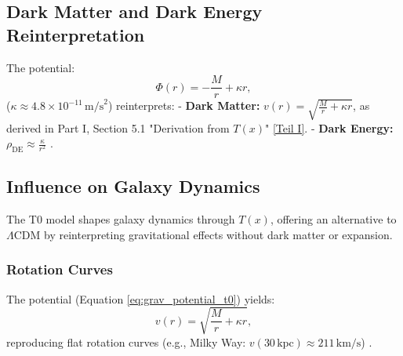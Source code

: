 \documentclass[twocolumn,aps,prl]{revtex4-2}
\newcommand{\Tfield}{T(x)}
\newcommand{\LCDM}{\Lambda\text{CDM}}
\begin{document}
	\subsection{Dark Matter and Dark Energy Reinterpretation}
	\label{subsec:dark_reinterpretation}
	
	The potential:
	\begin{equation}
		\Phi(r) = -\frac{M}{r} + \kappa r,
		\label{eq:grav_potential_t0}
	\end{equation}
	(\(\kappa \approx 4.8 \times 10^{-11} \, \text{m/s}^2\)) reinterprets:
	- \textbf{Dark Matter:} \(v(r) = \sqrt{\frac{M}{r} + \kappa r}\), as derived in Part I, Section 5.1 "Derivation from \(\Tfield\)" \href{https://github.com/jpascher/T0-Time-Mass-Duality/tree/main/2/pdf/English/Bridging Quantum Mechanics and Relativity through Time-Mass Duality Part I Theoretical Foundations_en.pdf}{[Teil I]}.
	- \textbf{Dark Energy:} \(\rho_{\text{DE}} \approx \frac{\kappa}{r^2}\) \cite{pascher_galaxies_2025}.
	
	\subsection{Influence on Galaxy Dynamics}
	\label{subsec:galaxy_dynamics}
	
	The T0 model shapes galaxy dynamics through \(\Tfield\), offering an alternative to \(\LCDM\) by reinterpreting gravitational effects without dark matter or expansion.
	
	\subsubsection{Rotation Curves}
	The potential (Equation \ref{eq:grav_potential_t0}) yields:
	\begin{equation}
		v(r) = \sqrt{\frac{M}{r} + \kappa r},
		\label{eq:rotation_velocity}
	\end{equation}
	reproducing flat rotation curves (e.g., Milky Way: \(v(30 \, \text{kpc}) \approx 211 \, \text{km/s}\)) \cite{pascher_galaxies_2025}.
	
\end{document}
